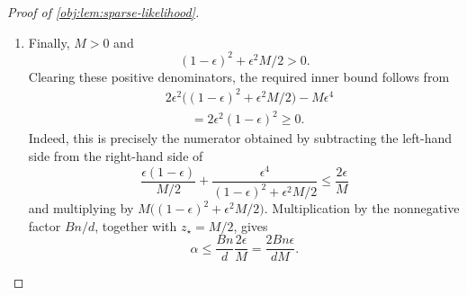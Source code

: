 \begin{proof}[Proof of \cref{obj:lem:sparse-likelihood}]
\begin{enumerate}
\item Finally, \(M>0\) and
\[
(1-\epsilon)^2+\epsilon^2M/2>0.
\]
Clearing these positive denominators, the required inner bound follows from
\[
\begin{aligned}
&2\epsilon^2\bigl((1-\epsilon)^2+\epsilon^2M/2\bigr)
-M\epsilon^4\\
&\qquad=2\epsilon^2(1-\epsilon)^2\ge0.
\end{aligned}
\]
Indeed, this is precisely the numerator obtained by subtracting the left-hand side from the right-hand side of
\[
\frac{\epsilon(1-\epsilon)}{M/2}
+\frac{\epsilon^4}{(1-\epsilon)^2+\epsilon^2M/2}
\le\frac{2\epsilon}{M}
\]
and multiplying by \(M\bigl((1-\epsilon)^2+\epsilon^2M/2\bigr)\).
Multiplication by the nonnegative factor \(Bn/d\), together with \(z_\star=M/2\), gives
\[
\alpha
\le\frac{Bn}{d}\frac{2\epsilon}{M}
=\frac{2Bn\epsilon}{dM}.
\]
\end{enumerate}
\end{proof}
